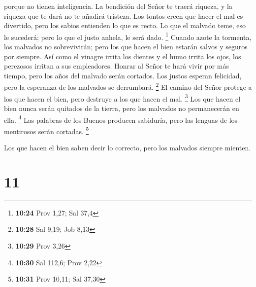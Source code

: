 porque no tienen inteligencia.  La bendición del Señor te
traerá riqueza, y la riqueza que te dará no te añadirá tristeza.
 Los tontos creen que hacer el mal es divertido, pero los
sabios entienden lo que es recto.  Lo que el malvado teme,
eso le sucederá; pero lo que el justo anhela, le será dado. \footnote{\textbf{10:24}
  Prov 1,27; Sal 37,4}  Cuando azote la tormenta, los
malvados no sobrevivirán; pero los que hacen el bien estarán salvos y
seguros por siempre.  Así como el vinagre irrita los
dientes y el humo irrita los ojos, los perezosos irritan a sus
empleadores.  Honrar al Señor te hará vivir por más tiempo,
pero los años del malvado serán cortados.  Los justos
esperan felicidad, pero la esperanza de los malvados se derrumbará.
\footnote{\textbf{10:28} Sal 9,19; Job 8,13}  El camino del
Señor protege a los que hacen el bien, pero destruye a los que hacen el
mal. \footnote{\textbf{10:29} Prov 3,26}  Los que hacen el
bien nunca serán quitados de la tierra, pero los malvados no
permanecerán en ella. \footnote{\textbf{10:30} Sal 112,6; Prov 2,22}
 Las palabras de los Buenos producen sabiduría, pero las
lenguas de los mentirosos serán cortadas. \footnote{\textbf{10:31} Prov
  10,11; Sal 37,30}

 Los que hacen el bien saben decir lo correcto, pero los
malvados siempre mienten.

\hypertarget{section-10}{%
\section{11}\label{section-10}}

